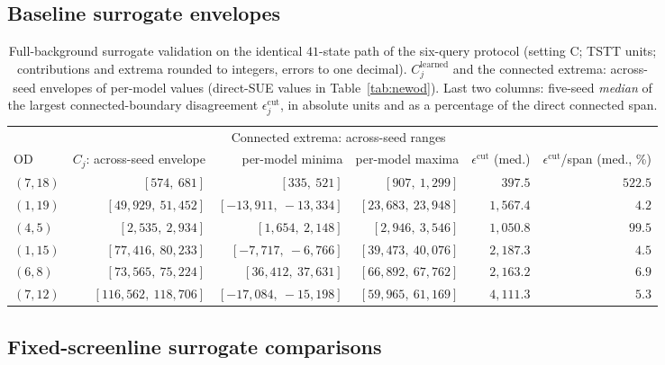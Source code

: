 \subsection{Baseline surrogate envelopes}\label{supp:baselineenvelopes}
\begin{table}[pos=htbp]
\caption{Full-background surrogate validation on the identical
$41$-state path of the six-query protocol (setting C; TSTT units;
contributions and extrema rounded to integers, errors to one
decimal). $C_j^{\mathrm{learned}}$ and the connected extrema:
across-seed envelopes of per-model values (direct-SUE values in
Table~\ref{tab:newod}). Last two columns: five-seed
\emph{median} of the largest connected-boundary disagreement
$\epsilon_j^{\mathrm{cut}}$, in absolute units and as a percentage of
the direct connected span.}
\label{tab:fullbgsurrogate}
\small
\begin{tabular*}{\tblwidth}{@{\extracolsep{\fill}}lrrrrr}
\toprule
& & \multicolumn{2}{c}{Connected extrema: across-seed ranges}\\
\cmidrule(lr){3-4}
OD & $C_j$: across-seed envelope & per-model minima & per-model maxima & $\epsilon^{\mathrm{cut}}$ (med.) & $\epsilon^{\mathrm{cut}}$/span (med., \%)\\
\midrule
$(7,18)$ & $[574,\ 681]$ & $[335,\ 521]$ & $[907,\ 1{,}299]$ & $397.5$ & $522.5$ \\
$(1,19)$ & $[49{,}929,\ 51{,}452]$ & $[-13{,}911,\ -13{,}334]$ & $[23{,}683,\ 23{,}948]$ & $1{,}567.4$ & $4.2$ \\
$(4,5)$ & $[2{,}535,\ 2{,}934]$ & $[1{,}654,\ 2{,}148]$ & $[2{,}946,\ 3{,}546]$ & $1{,}050.8$ & $99.5$ \\
$(1,15)$ & $[77{,}416,\ 80{,}233]$ & $[-7{,}717,\ -6{,}766]$ & $[39{,}473,\ 40{,}076]$ & $2{,}187.3$ & $4.5$ \\
$(6,8)$ & $[73{,}565,\ 75{,}224]$ & $[36{,}412,\ 37{,}631]$ & $[66{,}892,\ 67{,}762]$ & $2{,}163.2$ & $6.9$ \\
$(7,12)$ & $[116{,}562,\ 118{,}706]$ & $[-17{,}084,\ -15{,}198]$ & $[59{,}965,\ 61{,}169]$ & $4{,}111.3$ & $5.3$ \\
\bottomrule
\end{tabular*}
\end{table}



\subsection{Fixed-screenline surrogate comparisons}\label{supp:screenlinelearned}


